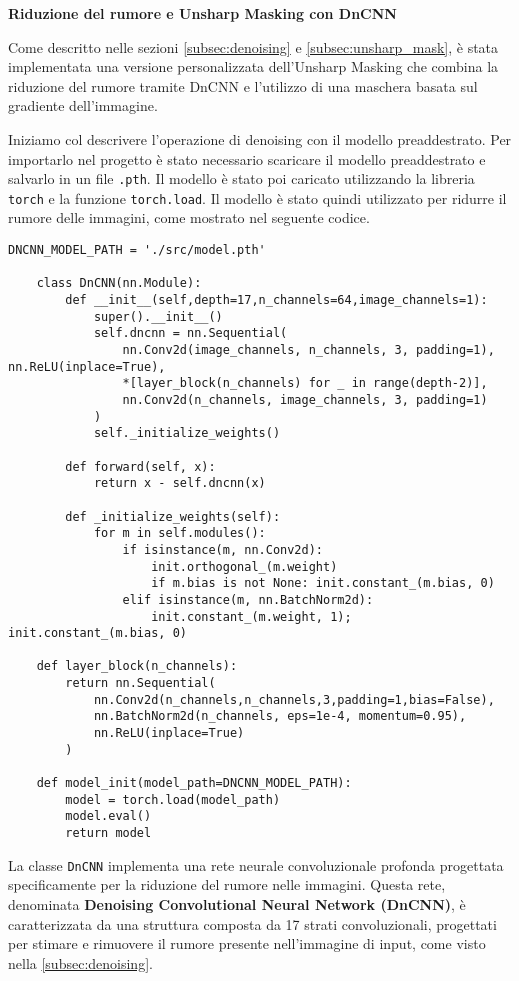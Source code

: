 \textbf{Riduzione del rumore e Unsharp Masking con DnCNN}

Come descritto nelle sezioni \ref{subsec:denoising} e \ref{subsec:unsharp_mask}, è stata implementata una versione personalizzata dell'Unsharp Masking che combina la riduzione del rumore tramite DnCNN e l'utilizzo di una maschera basata sul gradiente dell'immagine.

Iniziamo col descrivere l'operazione di denoising con il modello preaddestrato. Per importarlo nel progetto è stato necessario scaricare il modello preaddestrato e salvarlo in un file \texttt{.pth}. Il modello è stato poi caricato utilizzando la libreria \texttt{torch} e la funzione \texttt{torch.load}. Il modello è stato quindi utilizzato per ridurre il rumore delle immagini, come mostrato nel seguente codice.

\begin{lstlisting}[label={lst:dncnn}]
    DNCNN_MODEL_PATH = './src/model.pth'
    
    class DnCNN(nn.Module):
        def __init__(self,depth=17,n_channels=64,image_channels=1):
            super().__init__()
            self.dncnn = nn.Sequential(
                nn.Conv2d(image_channels, n_channels, 3, padding=1), nn.ReLU(inplace=True),
                *[layer_block(n_channels) for _ in range(depth-2)],
                nn.Conv2d(n_channels, image_channels, 3, padding=1)
            )
            self._initialize_weights()
    
        def forward(self, x):
            return x - self.dncnn(x)
    
        def _initialize_weights(self):
            for m in self.modules():
                if isinstance(m, nn.Conv2d):
                    init.orthogonal_(m.weight)
                    if m.bias is not None: init.constant_(m.bias, 0)
                elif isinstance(m, nn.BatchNorm2d):
                    init.constant_(m.weight, 1); init.constant_(m.bias, 0)
    
    def layer_block(n_channels):
        return nn.Sequential(
            nn.Conv2d(n_channels,n_channels,3,padding=1,bias=False),
            nn.BatchNorm2d(n_channels, eps=1e-4, momentum=0.95),
            nn.ReLU(inplace=True)
        )
    
    def model_init(model_path=DNCNN_MODEL_PATH):
        model = torch.load(model_path)
        model.eval()
        return model
\end{lstlisting}

La classe \texttt{DnCNN} implementa una rete neurale convoluzionale profonda progettata specificamente per la riduzione del rumore nelle immagini. Questa rete, denominata \textbf{Denoising Convolutional Neural Network (DnCNN)}, è caratterizzata da una struttura composta da 17 strati convoluzionali, progettati per stimare e rimuovere il rumore presente nell'immagine di input, come visto nella \cref{subsec:denoising}. 

